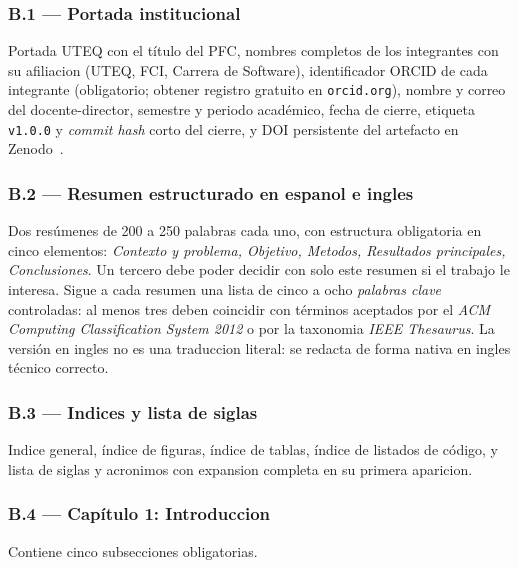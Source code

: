 \documentclass[11pt,a4paper]{article}
\begin{document}
\subsubsection*{B.1 --- Portada institucional}

Portada UTEQ con el t\'{i}tulo del PFC, nombres completos de los integrantes con su afiliacion (UTEQ, FCI, Carrera de Software), identificador ORCID de cada integrante (obligatorio; obtener registro gratuito en \texttt{orcid.org}), nombre y correo del docente-director, semestre y periodo acad\'{e}mico, fecha de cierre, etiqueta \texttt{v1.0.0} y \emph{commit hash} corto del cierre, y DOI persistente del artefacto en Zenodo~\cite{haak2012orcid,druskat2021cff,smith2016software}.

\subsubsection*{B.2 --- Resumen estructurado en espanol e ingles}

Dos res\'{u}menes de 200 a 250 palabras cada uno, con estructura obligatoria en cinco elementos: \emph{Contexto y problema, Objetivo, Metodos, Resultados principales, Conclusiones}. Un tercero debe poder decidir con solo este resumen si el trabajo le interesa. Sigue a cada resumen una lista de cinco a ocho \emph{palabras clave} controladas: al menos tres deben coincidir con t\'{e}rminos aceptados por el \emph{ACM Computing Classification System 2012} o por la taxonomia \emph{IEEE Thesaurus}. La versi\'{o}n en ingles no es una traduccion literal: se redacta de forma nativa en ingles t\'{e}cnico correcto.

\subsubsection*{B.3 --- Indices y lista de siglas}

Indice general, \'{i}ndice de figuras, \'{i}ndice de tablas, \'{i}ndice de listados de c\'{o}digo, y lista de siglas y acronimos con expansion completa en su primera aparicion.

\subsubsection*{B.4 --- Cap\'{i}tulo 1: Introduccion}

Contiene cinco subsecciones obligatorias.
\end{document}
